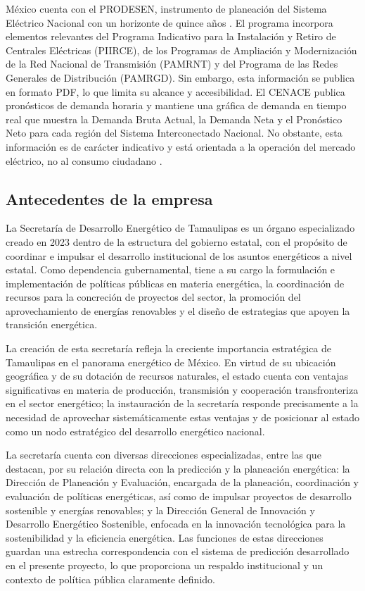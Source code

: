 México cuenta con el PRODESEN, instrumento de planeación del Sistema Eléctrico Nacional con un horizonte de quince años \cite{prodesen2023}. El programa incorpora elementos relevantes del Programa Indicativo para la Instalación y Retiro de Centrales Eléctricas (PIIRCE), de los Programas de Ampliación y Modernización de la Red Nacional de Transmisión (PAMRNT) y del Programa de las Redes Generales de Distribución (PAMRGD). Sin embargo, esta información se publica en formato PDF, lo que limita su alcance y accesibilidad. El CENACE publica pronósticos de demanda horaria y mantiene una gráfica de demanda en tiempo real que muestra la Demanda Bruta Actual, la Demanda Neta y el Pronóstico Neto para cada región del Sistema Interconectado Nacional. No obstante, esta información es de carácter indicativo y está orientada a la operación del mercado eléctrico, no al consumo ciudadano \cite{cenace2026}.

\subsection{Antecedentes de la empresa} \label{sec:antecedentes_empresa} %

La Secretaría de Desarrollo Energético de Tamaulipas es un órgano especializado creado en 2023 dentro de la estructura del gobierno estatal, con el propósito de coordinar e impulsar el desarrollo institucional de los asuntos energéticos a nivel estatal. Como dependencia gubernamental, tiene a su cargo la formulación e implementación de políticas públicas en materia energética, la coordinación de recursos para la concreción de proyectos del sector, la promoción del aprovechamiento de energías renovables y el diseño de estrategias que apoyen la transición energética.

La creación de esta secretaría refleja la creciente importancia estratégica de Tamaulipas en el panorama energético de México. En virtud de su ubicación geográfica y de su dotación de recursos naturales, el estado cuenta con ventajas significativas en materia de producción, transmisión y cooperación transfronteriza en el sector energético; la instauración de la secretaría responde precisamente a la necesidad de aprovechar sistemáticamente estas ventajas y de posicionar al estado como un nodo estratégico del desarrollo energético nacional.

La secretaría cuenta con diversas direcciones especializadas, entre las que destacan, por su relación directa con la predicción y la planeación energética: la Dirección de Planeación y Evaluación, encargada de la planeación, coordinación y evaluación de políticas energéticas, así como de impulsar proyectos de desarrollo sostenible y energías renovables; y la Dirección General de Innovación y Desarrollo Energético Sostenible, enfocada en la innovación tecnológica para la sostenibilidad y la eficiencia energética. Las funciones de estas direcciones guardan una estrecha correspondencia con el sistema de predicción desarrollado en el presente proyecto, lo que proporciona un respaldo institucional y un contexto de política pública claramente definido.

